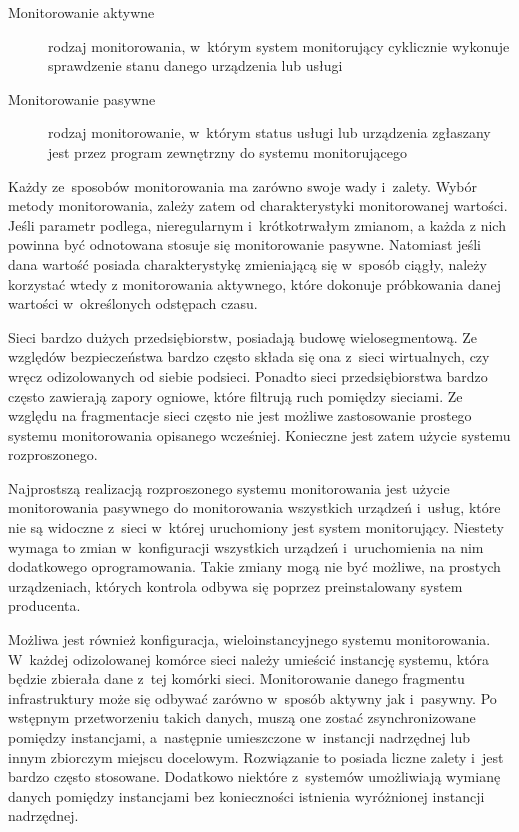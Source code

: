 \begin{description}
\item[Monitorowanie aktywne] rodzaj monitorowania, w~którym system
  monitorujący cyklicznie wykonuje sprawdzenie stanu danego
  urządzenia lub usługi
\item[Monitorowanie pasywne] rodzaj monitorowanie, w~którym status
  usługi lub urządzenia zgłaszany jest przez program zewnętrzny do
  systemu monitorującego
\end{description}

Każdy ze~sposobów monitorowania ma zarówno swoje wady i~zalety. Wybór
metody monitorowania, zależy zatem od charakterystyki monitorowanej
wartości. Jeśli parametr podlega, nieregularnym i~krótkotrwałym
zmianom, a każda z nich powinna być odnotowana stosuje się
monitorowanie pasywne. Natomiast jeśli dana wartość posiada
charakterystykę zmieniającą się w~sposób ciągły, należy korzystać
wtedy z monitorowania aktywnego, które dokonuje próbkowania danej
wartości w~określonych odstępach czasu.

Sieci bardzo dużych przedsiębiorstw, posiadają budowę
wielosegmentową. Ze względów bezpieczeństwa bardzo często składa się
ona z~sieci wirtualnych, czy wręcz odizolowanych od siebie
podsieci. Ponadto sieci przedsiębiorstwa bardzo często zawierają
zapory ogniowe, które filtrują ruch pomiędzy sieciami. Ze względu na
fragmentacje sieci często nie jest możliwe zastosowanie prostego
systemu monitorowania opisanego wcześniej. Konieczne jest zatem użycie
systemu rozproszonego.

Najprostszą realizacją rozproszonego systemu monitorowania jest użycie
monitorowania pasywnego do monitorowania wszystkich urządzeń i~usług,
które nie są widoczne z~sieci w~której uruchomiony jest system
monitorujący. Niestety wymaga to zmian w~konfiguracji wszystkich
urządzeń i~uruchomienia na nim dodatkowego oprogramowania. Takie
zmiany mogą nie być możliwe, na prostych urządzeniach, których
kontrola odbywa się poprzez preinstalowany system producenta. 

Możliwa jest również konfiguracja, wieloinstancyjnego systemu
monitorowania. W~każdej odizolowanej komórce sieci należy umieścić
instancję systemu, która będzie zbierała dane z~tej komórki
sieci. Monitorowanie danego fragmentu infrastruktury może się odbywać
zarówno w~sposób aktywny jak i~pasywny. Po wstępnym przetworzeniu
takich danych, muszą one zostać zsynchronizowane pomiędzy instancjami,
a~następnie umieszczone w~instancji nadrzędnej lub innym zbiorczym
miejscu docelowym. Rozwiązanie to posiada liczne zalety i~jest bardzo
często stosowane. Dodatkowo niektóre z~systemów umożliwiają wymianę
danych pomiędzy instancjami bez konieczności istnienia wyróżnionej
instancji nadrzędnej.

